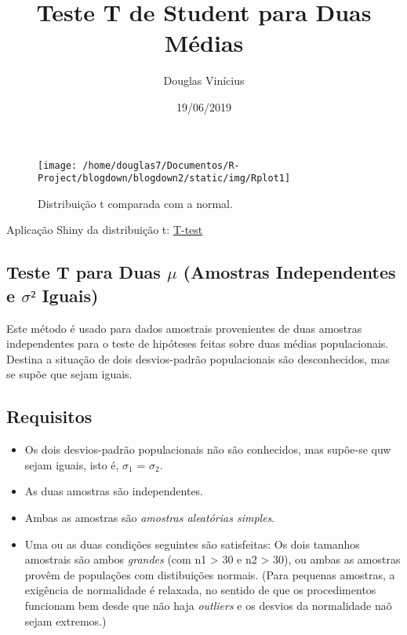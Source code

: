 \documentclass[]{article}
\title{Teste T de Student para Duas Médias}
\author{Douglas Vinícius}
\date{19/06/2019}
\providecommand{\tightlist}{%
  \setlength{\itemsep}{0pt}\setlength{\parskip}{0pt}}
\begin{document}
\maketitle

\begin{figure}
\texttt{[image: /home/douglas7/Documentos/R-Project/blogdown/blogdown2/static/img/Rplot1]} \caption{Distribuição t comparada com a normal.}\label{fig:setup}
\end{figure}

Aplicação Shiny da distribuição t:
\href{https://douglas-vincius.shinyapps.io/T-test-shiny/}{T-test}

\hypertarget{teste-t-para-duas-mu-amostras-independentes-e-sigma-iguais}{%
\subsection{\texorpdfstring{Teste T para Duas \(\mu\) (Amostras
Independentes e \(\sigma²\)
Iguais)}{Teste T para Duas \textbackslash{}mu (Amostras Independentes e \textbackslash{}sigma² Iguais)}}\label{teste-t-para-duas-mu-amostras-independentes-e-sigma-iguais}}

Este método é usado para dados amostrais provenientes de duas amostras
independentes para o teste de hipóteses feitas sobre duas médias
populacionais. Destina a situação de dois desvios-padrão populacionais
são desconhecidos, mas se supõe que sejam iguais.

\hypertarget{requisitos}{%
\subsection{Requisitos}\label{requisitos}}

\begin{itemize}
\tightlist
\item
  Os dois desvios-padrão populacionais não são conhecidos, mas supõe-se
  quw sejam iguais, isto é, \(\sigma_{1}\) = \(\sigma_{2}\).
\item
  As duas amostras são independentes.
\item
  Ambas as amostras são \emph{amostras aleatórias simples}.
\item
  Uma ou as duas condições seguintes são satisfeitas: Os dois tamanhos
  amostrais são ambos \emph{grandes} (com n1 \textgreater{} 30 e n2
  \textgreater{} 30), ou ambas as amostras provêm de populações com
  distibuições normais. (Para pequenas amostras, a exigência de
  normalidade é relaxada, no sentido de que os procedimentos funcionam
  bem desde que não haja \emph{outliers} e os desvios da normalidade naõ
  sejam extremos.)
\end{itemize}
\end{document}
